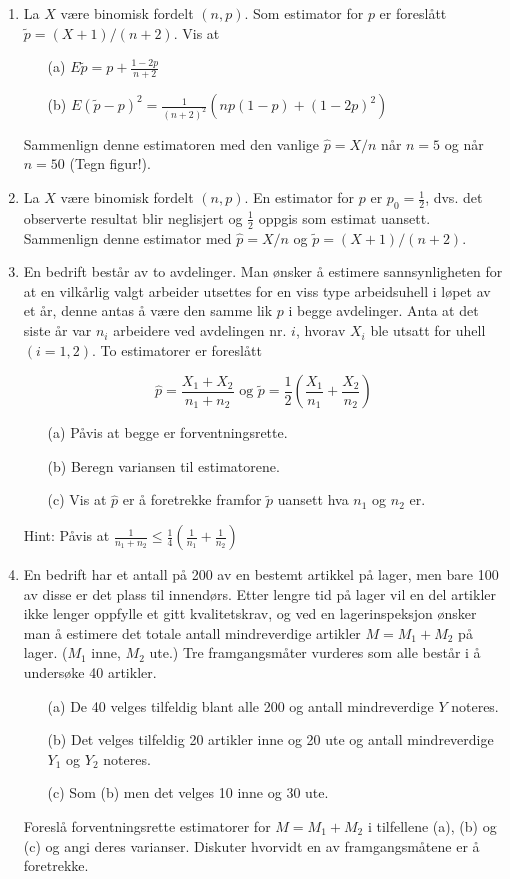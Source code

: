 \begin{enumerate}
\item La $X$ være binomisk fordelt $(n,p)$. Som estimator for $p$
er foreslått $\tilde{p} =(X+1)/(n+2)$. Vis at
\begin{itemize}
\item[(a)]  $E\tilde{p}=p+\frac{1-2p}{n+2} $
\item[(b)]  $E{(\tilde{p}-p)}^2=\frac{1}{{(n+2)}^2}(np(1-p)+{(1-2p)}^2) $
\end{itemize}
Sammenlign denne estimatoren med den vanlige $\hat{p} =X/n$
når $n=5$ og når $n=50$ (Tegn figur!).

\item La $X$ være binomisk fordelt $(n,p)$. En estimator for $p$
er $p_0 = \frac{1}{2}$, dvs. det observerte resultat blir
neglisjert og $\frac{1}{2}$ oppgis som estimat uansett.
Sammenlign denne estimator med $\hat{p} =X/n$ og $\tilde{p}=(X+1)/(n+2)$.

\item En bedrift består av to avdelinger. Man ønsker å estimere
sannsynligheten for at en vilkårlig valgt arbeider utsettes
for en viss type arbeidsuhell i løpet av et år, denne antas
å være den samme lik $p$ i begge avdelinger. Anta at det
siste år var $n_i$ arbeidere ved avdelingen nr. $i$, hvorav
$X_i$ ble utsatt for uhell $(i=1,2)$. To estimatorer er
foreslått

\[  \hat{p}=\frac{X_1+X_2}{n_1+n_2} \mbox{\ \ og \ \ }
                  \tilde p =\frac{1}{2}(\frac{X_1}{n_1}+\frac{X_2}{n_2}) \]
\begin{itemize}
\item[(a)] Påvis at begge er forventningsrette.
\item[(b)] Beregn variansen til estimatorene.
\item[(c)] Vis at $\hat{p}$ er å foretrekke framfor $\tilde p$
 uansett hva $n_1$ og $n_2$ er.
\end{itemize}
Hint: Påvis at   $\frac{1}{n_1+n_2}\leq
                     \frac{1}{4}(\frac{1}{n_1}+\frac{1}{n_2}) $

\item En bedrift har et antall på 200 av en bestemt artikkel på
lager, men bare 100 av disse er det plass til innendørs.
Etter lengre tid på lager vil en del artikler ikke lenger
oppfylle et gitt kvalitetskrav, og ved en lagerinspeksjon
ønsker man å estimere det totale antall mindreverdige
artikler $M=M_1+M_2$ på lager. ($M_1$ inne, $M_2$ ute.) Tre
framgangsmåter vurderes som alle består i å undersøke 40
artikler.
\begin{itemize}
\item[(a)]De 40 velges tilfeldig blant alle 200 og antall
   mindreverdige $Y$ noteres.
\item[(b)] Det velges tilfeldig 20 artikler inne og 20 ute og
    antall mindreverdige $Y_1$ og $Y_2$ noteres.
\item[(c)] Som (b) men det velges 10 inne og 30 ute.
\end{itemize}
  Foreslå forventningsrette estimatorer for $M=M_1+M_2$ i
  tilfellene (a), (b) og (c) og angi deres varianser.
  Diskuter hvorvidt en av framgangsmåtene er å foretrekke.


\end{enumerate}
